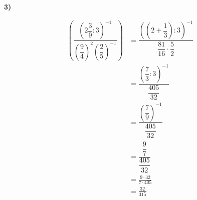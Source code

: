 \documentclass[11pt,a4paper,fleqn]{article}
\begin{document}
\textbf{3)}

\begin{align*}
  \left( \dfrac{\left( 2\dfrac{3}{9} : 3 \right)^{-1}}
               {\left( \dfrac{9}{4} \right)^{2} \left( \dfrac{2}{5} \right)^{-1}} \right)
    &= \dfrac{\left( \left( 2 + \dfrac{1}{3} \right) : 3 \right)^{-1}}
             {\dfrac{81}{16} \cdot \dfrac{5}{2}} \\[6pt]
    &= \dfrac{\left( \dfrac{7}{3} : 3 \right)^{-1}}{\dfrac{405}{32}} \\[6pt]
    &= \dfrac{\left( \dfrac{7}{9} \right)^{-1}}{\dfrac{405}{32}} \\[6pt]
    &= \dfrac{\dfrac{9}{7}}{\dfrac{405}{32}} \\[6pt]
    &= \frac{9 \cdot 32}{7 \cdot 405} \\[6pt]
    &= \frac{32}{315}
\end{align*}
\end{document}
